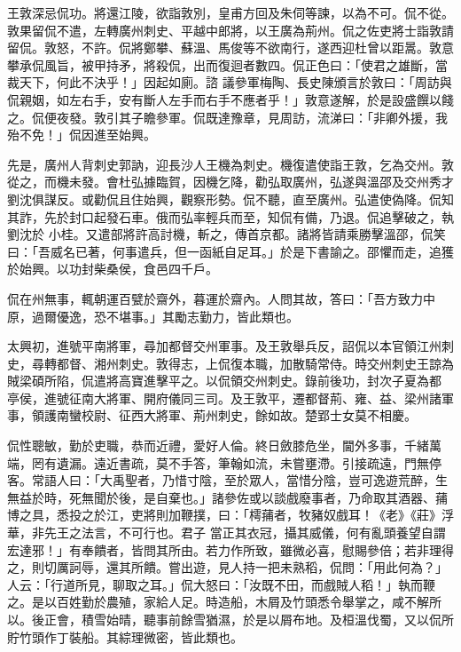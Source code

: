 \begin{pinyinscope}
 王敦深忌侃功。將還江陵，欲詣敦別，皇甫方回及朱伺等諫，以為不可。侃不從。敦果留侃不遣，左轉廣州刺史、平越中郎將，以王廣為荊州。侃之佐吏將士詣敦請留侃。敦怒，不許。侃將鄭攀、蘇溫、馬俊等不欲南行，遂西迎杜曾以距暠。敦意攀承侃風旨，被甲持矛，將殺侃，出而復迴者數四。侃正色曰：「使君之雄斷，當裁天下，何此不決乎！」因起如廁。諮
 議參軍梅陶、長史陳頒言於敦曰：「周訪與侃親姻，如左右手，安有斷人左手而右手不應者乎！」敦意遂解，於是設盛饌以餞之。侃便夜發。敦引其子瞻參軍。侃既達豫章，見周訪，流涕曰：「非卿外援，我殆不免！」侃因進至始興。



 先是，廣州人背刺史郭訥，迎長沙人王機為刺史。機復遣使詣王敦，乞為交州。敦從之，而機未發。會杜弘據臨賀，因機乞降，勸弘取廣州，弘遂與溫邵及交州秀才劉沈俱謀反。或勸侃且住始興，觀察形勢。侃不聽，直至廣州。弘遣使偽降。侃知其詐，先於封口起發石車。俄而弘率輕兵而至，知侃有備，乃退。侃追擊破之，執劉沈於
 小桂。又遣部將許高討機，斬之，傳首京都。諸將皆請乘勝擊溫邵，侃笑曰：「吾威名已著，何事遣兵，但一函紙自足耳。」於是下書諭之。邵懼而走，追獲於始興。以功封柴桑侯，食邑四千戶。



 侃在州無事，輒朝運百甓於齋外，暮運於齋內。人問其故，答曰：「吾方致力中原，過爾優逸，恐不堪事。」其勵志勤力，皆此類也。



 太興初，進號平南將軍，尋加都督交州軍事。及王敦舉兵反，詔侃以本官領江州刺史，尋轉都督、湘州刺史。敦得志，上侃復本職，加散騎常侍。時交州刺史王諒為賊梁碩所陷，侃遣將高寶進擊平之。以侃領交州刺史。錄前後功，封次子夏為都
 亭侯，進號征南大將軍、開府儀同三司。及王敦平，遷都督荊、雍、益、梁州諸軍事，領護南蠻校尉、征西大將軍、荊州刺史，餘如故。楚郢士女莫不相慶。



 侃性聰敏，勤於吏職，恭而近禮，愛好人倫。終日斂膝危坐，閫外多事，千緒萬端，罔有遺漏。遠近書疏，莫不手答，筆翰如流，未嘗壅滯。引接疏遠，門無停客。常語人曰：「大禹聖者，乃惜寸陰，至於眾人，當惜分陰，豈可逸遊荒醉，生無益於時，死無聞於後，是自棄也。」諸參佐或以談戲廢事者，乃命取其酒器、蒱博之具，悉投之於江，吏將則加鞭撲，曰：「樗蒱者，牧豬奴戲耳！《老》《莊》浮華，非先王之法言，不可行也。君子
 當正其衣冠，攝其威儀，何有亂頭養望自謂宏達邪！」有奉饋者，皆問其所由。若力作所致，雖微必喜，慰賜參倍；若非理得之，則切厲訶辱，還其所饋。嘗出遊，見人持一把未熟稻，侃問：「用此何為？」人云：「行道所見，聊取之耳。」侃大怒曰：「汝既不田，而戲賊人稻！」執而鞭之。是以百姓勤於農殖，家給人足。時造船，木屑及竹頭悉令舉掌之，咸不解所以。後正會，積雪始晴，聽事前餘雪猶濕，於是以屑布地。及桓溫伐蜀，又以侃所貯竹頭作丁裝船。其綜理微密，皆此類也。




\end{pinyinscope}
